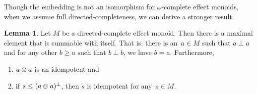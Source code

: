 \documentclass[10pt,conference]{IEEEtran}
\newcounter{counter}
\theoremstyle{definition}
\newtheorem{lemma}[counter]{Lemma}
\begin{document}
Though the embedding is not an isomorphism for $\omega$-complete effect monoids, when we assume full 
directed-completeness, we can derive a stronger result.

\begin{lemma}\label{lem:maximalsummableelement}
    Let $M$ be a directed-complete effect monoid.
    Then there is a
    maximal element that is summable with itself. That is:
    there is an~$a\in M$ such that $a\perp a$ and for any other $b\geq a$ such that $b\perp b$, we have $b=a$.
    Furthermore,
 \begin{enumerate}
    \item
    $a\ovee a$ is an idempotent and
    \item
        if $s\leq (a\ovee a)^\perp$,
        then $s$ is idempotent for any~$s \in M$.
 \end{enumerate}
\end{lemma}
\end{document}
